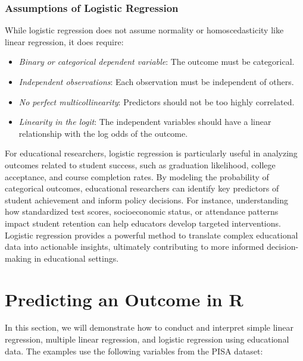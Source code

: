 \documentclass[
  letterpaper,
  DIV=11,
  numbers=noendperiod]{scrreprt}
\begin{document}
\subsection{Assumptions of Logistic
Regression}\label{assumptions-of-logistic-regression}

While logistic regression does not assume normality or homoscedasticity
like linear regression, it does require:

\begin{itemize}
\item
  \emph{Binary or categorical dependent variable}: The outcome must be
  categorical.
\item
  \emph{Independent observations}: Each observation must be independent
  of others.
\item
  \emph{No perfect multicollinearity}: Predictors should not be too
  highly correlated.
\item
  \emph{Linearity in the logit}: The independent variables should have a
  linear relationship with the log odds of the outcome.
\end{itemize}

For educational researchers, logistic regression is particularly useful
in analyzing outcomes related to student success, such as graduation
likelihood, college acceptance, and course completion rates. By modeling
the probability of categorical outcomes, educational researchers can
identify key predictors of student achievement and inform policy
decisions. For instance, understanding how standardized test scores,
socioeconomic status, or attendance patterns impact student retention
can help educators develop targeted interventions. Logistic regression
provides a powerful method to translate complex educational data into
actionable insights, ultimately contributing to more informed
decision-making in educational settings.


\chapter*{Predicting an Outcome in R}\label{predicting-an-outcome-in-r}


In this section, we will demonstrate how to conduct and interpret simple
linear regression, multiple linear regression, and logistic regression
using educational data. The examples use the following variables from
the PISA dataset:
\end{document}
